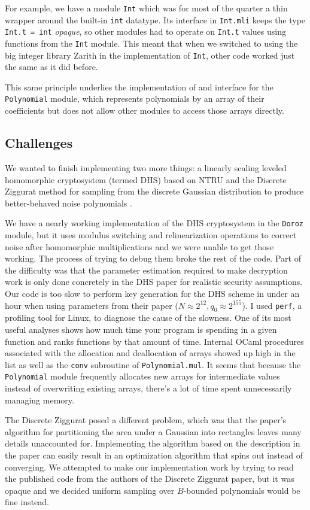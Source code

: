 \documentclass[10pt]{article}
\begin{document}
For example, we have a module \texttt{Int} which was for most of the quarter a
thin wrapper around the built-in \texttt{int} datatype. Its interface in
\texttt{Int.mli} keeps the type \texttt{Int.t = int} \emph{opaque}, so other
modules had to operate on \texttt{Int.t} values using functions from the
\texttt{Int} module. This meant that when we switched to using the big integer
library Zarith in the implementation of \texttt{Int}, other code worked just the
same as it did before.

This same principle underlies the implementation of and interface for the
\texttt{Polynomial} module, which represents polynomials by an array of their
coefficients but does not allow other modules to access those arrays directly.

\subsection{Challenges}

We wanted to finish implementing two more things: a linearly scaling leveled
homomorphic cryptosystem (termed DHS) based on NTRU
\cite{DBLP:journals/iacr/DorozHS14} and the Discrete Ziggurat method for
sampling from the discrete Gaussian distribution to produce better-behaved noise
polynomials \cite{ziggurat}.

We have a nearly working implementation of the DHS cryptosystem in the
\texttt{Doroz} module, but it uses modulus switching and relinearization
operations to correct noise after homomorphic multiplications and we were unable
to get those working. The process of trying to debug them broke the rest of the
code. Part of the difficulty was that the parameter estimation required to make
decryption work is only done concretely in the DHS paper for realistic security
assumptions. Our code is too slow to perform key generation for the DHS scheme
in under an hour when using parameters from their paper (\(N \approx 2^{12}, q_0
\approx 2^{155}\)). I used \texttt{perf}, a profiling tool for Linux, to
diagnose the cause of the slowness. One of its most useful analyses shows how
much time your program is spending in a given function and ranks functions by
that amount of time. Internal OCaml procedures associated with the allocation
and deallocation of arrays showed up high in the list as well as the
\texttt{conv} subroutine of \texttt{Polynomial.mul}. It seems that because the
\texttt{Polynomial} module frequently allocates new arrays for intermediate
values instead of overwriting existing arrays, there's a lot of time spent
unnecessarily managing memory.

The Discrete Ziggurat posed a different problem, which was that the paper's
algorithm for partitioning the area under a Gaussian into rectangles leaves many
details unaccounted for. Implementing the algorithm based on the description in
the paper can easily result in an optimization algorithm that spins out instead
of converging. We attempted to make our implementation work by trying to read
the published code from the authors of the Discrete Ziggurat paper, but it was
opaque and we decided uniform sampling over \(B\)-bounded polynomials would be
fine instead.

\printbibliography
\end{document}
